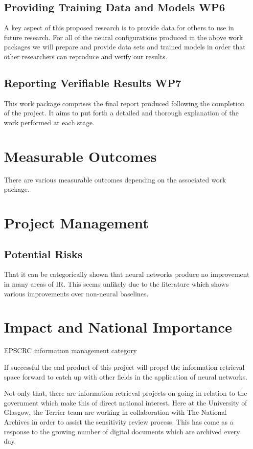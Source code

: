 \documentclass[11pt,english,twocolumn]{article}
\begin{document}
\subsection{Providing Training Data and Models \textbf{WP6}}
A key aspect of this proposed research is to provide data for others to use in future research. For all of the neural configurations produced in the above work packages we will prepare and provide data sets and trained models in order that other researchers can reproduce and verify our results.

\subsection{Reporting Verifiable Results \textbf{WP7}}
This work package comprises the final report produced following the completion of the project. It aims to put forth a detailed and thorough explanation of the work performed at each stage.

\section{Measurable Outcomes}
There are various measurable outcomes depending on the associated work package.

\section{Project Management}
\subsection{Potential Risks}
That it can be categorically shown that neural networks produce no improvement in many areas of IR. This seems unlikely due to the literature which shows various improvements over non-neural baselines.

\section{Impact and National Importance}
EPSCRC information management category

If successful the end product of this project will propel the information retrieval space forward to catch up with other fields in the application of neural networks.

Not only that, there are information retrieval projects on going in relation to the government which make this of direct national interest.
Here at the University of Glasgow, the Terrier team are working in collaboration with The National Archives in order to assist the sensitivity review process. This has come as a response to the growing number of digital documents which are archived every day.
\end{document}
